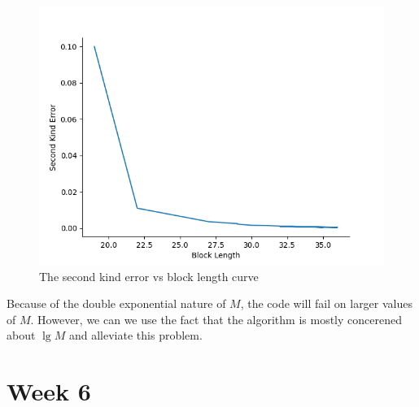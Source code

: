 \documentclass{article}
\begin{document}
\begin{figure}
	\includegraphics*[height = 0.4 \textheight]{graphic/ErrorVsBlocklength.png}
	\caption{The second kind error vs block length curve}
\end{figure}

Because of the double exponential nature of \(M\), the code will fail on larger values of \(M\). However, we can we use the fact that the algorithm is mostly concerened about \(\lg M\) and alleviate this problem.

\section{Week 6}
\end{document}
